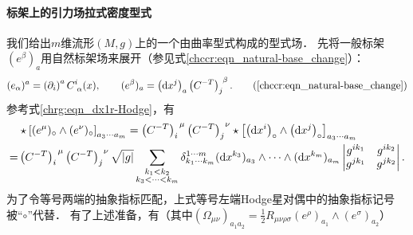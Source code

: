 \paragraph{标架上的引力场拉式密度型式}
我们给出$m$维流形$(M,g)$上的一个由曲率型式构成的型式场．
先将一般标架$({e}^\beta)_a$用自然标架场来展开（参见式\eqref{chccr:eqn_natural-base_change}）：
\begin{align}
	({e}_\alpha)^a = \left(\partial_i\right)^a C_{\hphantom{i}\alpha}^{i} (x), \qquad
	({e}^\beta)_a  = \left({\rm d} x^j \right)_a \left(C^{-T}\right)^{\hphantom{j}\beta}_{j}  .
	\tag{\ref{chccr:eqn_natural-base_change}}
\end{align}
参考式\eqref{chrg:eqn_dx1r-Hodge}，有
\begin{align*}
	&\star \left[ (e^\mu)_{\circ} \wedge (e^\nu)_{\circ}\right]_{a_3 \cdots a_m} =  
	\left(C^{-T}\right)^{\hphantom{a}\mu}_{i} \left(C^{-T}\right)^{\hphantom{a}\nu}_{j} 
	\star \left[\left({\rm d} x^i \right)_{\circ} \wedge \left({\rm d} x^j \right)_{\circ}\right]_{a_3 \cdots a_m} \\
	=& \left(C^{-T}\right)^{\hphantom{a}\mu}_{i} \left(C^{-T}\right)^{\hphantom{a}\nu}_{j} 
	\sqrt{|g|} \sum_{\substack {k_1<k_2 \\ k_{3}<\cdots<k_m}}
	\delta_{k_1 \cdots k_m}^{1 \cdots m}
	({\rm d}x^{k_{3}})_{a_{3}} \wedge \cdots \wedge ({\rm d}x^{k_m})_{a_m}
	\begin{vmatrix}
		g^{i k_1} & g^{i k_2}  \\
		g^{j k_1} & g^{j k_2}  \\
	\end{vmatrix}.
\end{align*}
为了令等号两端的抽象指标匹配，上式等号左端Hodge星对偶中的抽象指标记号被“$\circ$”代替．
有了上述准备，有（其中$(\Omega_{\mu\nu} )_{a_1 a_2} =
\frac{1}{2}R_{\mu \nu \rho\sigma} (e^\rho)_{a_1} \wedge (e^\sigma)_{a_2}$）
